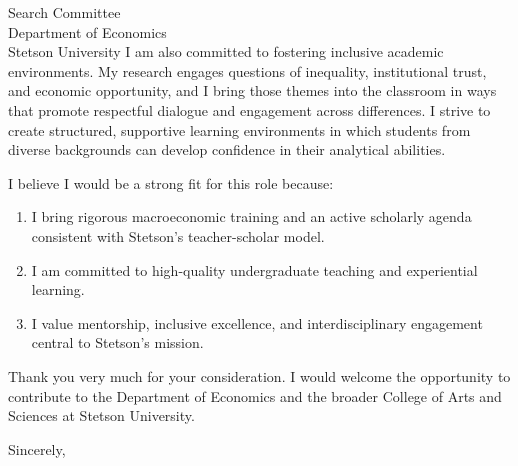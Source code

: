 \documentclass[11pt,letterpaper]{letter}
\begin{document}
\begin{letter}{
Search Committee \\
Department of Economics \\
Stetson University
}
I am also committed to fostering inclusive academic environments. My research engages questions of inequality, institutional trust, and economic opportunity, and I bring those themes into the classroom in ways that promote respectful dialogue and engagement across differences. I strive to create structured, supportive learning environments in which students from diverse backgrounds can develop confidence in their analytical abilities.

I believe I would be a strong fit for this role because:
\begin{enumerate}
    \item I bring rigorous macroeconomic training and an active scholarly agenda consistent with Stetson’s teacher-scholar model.
    \item I am committed to high-quality undergraduate teaching and experiential learning.
    \item I value mentorship, inclusive excellence, and interdisciplinary engagement central to Stetson’s mission.
\end{enumerate}

Thank you very much for your consideration. I would welcome the opportunity to contribute to the Department of Economics and the broader College of Arts and Sciences at Stetson University.

\closing{Sincerely,}

\end{letter}
\end{document}
